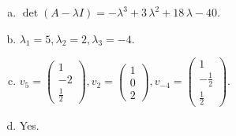 \begin{questions}
\begin{solution}
\begin{enumerate}[(a)]
\item $\det(A-\lambda I)=-{\lambda}^{3} + 3 \, {\lambda}^{2} + 18 \, {\lambda} - 40$.
\item ${\lambda}_1=5, {\lambda}_2=2, {\lambda}_3=-4$.
\item $v_{5}=\left(\begin{array}{r}
1 \\
-2 \\
\frac{1}{2}
\end{array}\right), v_{2}=\left(\begin{array}{r}
1 \\
0 \\
2
\end{array}\right), v_{-4}=\left(\begin{array}{r}
1 \\
-\frac{1}{2} \\
\frac{1}{2}
\end{array}\right)$.
\item Yes.
\end{enumerate}
\end{solution}

\end{questions}

\newpage


\begin{center}
\end{center}

